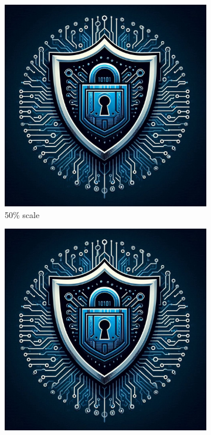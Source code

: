 \begin{figure}[htbp]
    \begin{subfigure}[b]{0.3\textwidth}
        \centering
        \includegraphics[width=\textwidth,scale=0.5]{content/images/logo.jpg}
        \caption{50\% scale}
        \label{fig:grid_scale50}
    \end{subfigure}
    \hfill
    \begin{subfigure}[b]{0.3\textwidth}
        \centering
        \includegraphics[width=\textwidth,scale=0.75]{content/images/logo.jpg}

\end{subfigure}
\end{figure}
